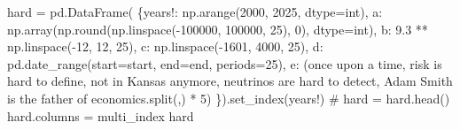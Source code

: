 \documentclass[
  11pt,
  a4paper,
  DIV=11,
  numbers=noendperiod]{scrartcl}
\newenvironment{Shaded}{\begin{snugshade}}{\end{snugshade}}
\newcommand{\BuiltInTok}[1]{\textcolor[rgb]{0.00,0.23,0.31}{#1}}
\newcommand{\CommentTok}[1]{\textcolor[rgb]{0.37,0.37,0.37}{#1}}
\newcommand{\DecValTok}[1]{\textcolor[rgb]{0.68,0.00,0.00}{#1}}
\newcommand{\FloatTok}[1]{\textcolor[rgb]{0.68,0.00,0.00}{#1}}
\newcommand{\NormalTok}[1]{\textcolor[rgb]{0.00,0.23,0.31}{#1}}
\newcommand{\OperatorTok}[1]{\textcolor[rgb]{0.37,0.37,0.37}{#1}}
\newcommand{\StringTok}[1]{\textcolor[rgb]{0.13,0.47,0.30}{#1}}
\begin{document}
\begin{Shaded}
\begin{Highlighting}[]
\NormalTok{hard }\OperatorTok{=}\NormalTok{ pd.DataFrame(}
\NormalTok{\{}\StringTok{\textquotesingle{}years!\textquotesingle{}}\NormalTok{: np.arange(}\DecValTok{2000}\NormalTok{, }\DecValTok{2025}\NormalTok{, dtype}\OperatorTok{=}\BuiltInTok{int}\NormalTok{),}
\StringTok{\textquotesingle{}a\textquotesingle{}}\NormalTok{: np.array(np.}\BuiltInTok{round}\NormalTok{(np.linspace(}\OperatorTok{{-}}\DecValTok{100000}\NormalTok{, }\DecValTok{100000}\NormalTok{, }\DecValTok{25}\NormalTok{), }\DecValTok{0}\NormalTok{), dtype}\OperatorTok{=}\BuiltInTok{int}\NormalTok{),}
\StringTok{\textquotesingle{}b\textquotesingle{}}\NormalTok{: }\FloatTok{9.3} \OperatorTok{**}\NormalTok{ np.linspace(}\OperatorTok{{-}}\DecValTok{12}\NormalTok{, }\DecValTok{12}\NormalTok{, }\DecValTok{25}\NormalTok{),}
\StringTok{\textquotesingle{}c\textquotesingle{}}\NormalTok{: np.linspace(}\OperatorTok{{-}}\DecValTok{1601}\NormalTok{, }\DecValTok{4000}\NormalTok{, }\DecValTok{25}\NormalTok{),}
\StringTok{\textquotesingle{}d\textquotesingle{}}\NormalTok{: pd.date\_range(start}\OperatorTok{=}\NormalTok{start, end}\OperatorTok{=}\NormalTok{end, periods}\OperatorTok{=}\DecValTok{25}\NormalTok{),}
\StringTok{\textquotesingle{}e\textquotesingle{}}\NormalTok{: (}\StringTok{\textquotesingle{}once upon a time, risk is hard to define, not in Kansas anymore, \textquotesingle{}}
        \StringTok{\textquotesingle{}neutrinos are hard to detect,  \textquotesingle{}}
        \StringTok{\textquotesingle{}Adam Smith is the father of economics\textquotesingle{}}\NormalTok{.split(}\StringTok{\textquotesingle{},\textquotesingle{}}\NormalTok{) }\OperatorTok{*} \DecValTok{5}\NormalTok{)}
\NormalTok{\}).set\_index(}\StringTok{\textquotesingle{}years!\textquotesingle{}}\NormalTok{)}
\CommentTok{\# hard = hard.head()}
\NormalTok{hard.columns }\OperatorTok{=}\NormalTok{ multi\_index}
\NormalTok{hard}
\end{Highlighting}
\end{Shaded}
\end{document}
